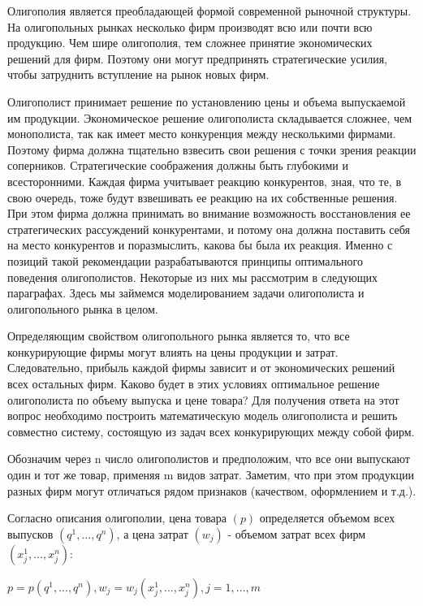 \documentclass[12pt, 4paper]{book}
\begin{document}
{Олигополия является преобладающей формой современной рыночной структуры. На олигопольных рынках несколько фирм производят всю или почти всю продукцию. Чем шире олигополия, тем сложнее принятие экономических решений для фирм. Поэтому они могут предпринять стратегические усилия, чтобы затруднить вступление на рынок новых фирм.
\par

Олигополист принимает решение по установлению цены и объема выпускаемой им продукции. Экономическое решение олигополиста складывается сложнее, чем монополиста, так как имеет место конкуренция между несколькими фирмами. Поэтому фирма должна тщательно взвесить свои решения с точки зрения реакции соперников. Стратегические соображения должны быть глубокими и всесторонними. Каждая фирма учитывает реакцию конкурентов, зная, что те, в свою очередь, тоже будут взвешивать ее реакцию на их собственные решения. При этом фирма должна принимать во внимание возможность восстановления ее стратегических рассуждений конкурентами, и потому она должна поставить себя на место конкурентов и поразмыслить, какова бы была их реакция. Именно с позиций такой рекомендации разрабатываются принципы оптимального поведения олигополистов. Некоторые из них мы рассмотрим в следующих параграфах. Здесь мы займемся моделированием задачи олигополиста и олигопольного рынка в целом.
\par

Определяющим свойством олигопольного рынка является то, что все конкурирующие фирмы могут влиять на цены продукции и затрат. Следовательно, прибыль каждой фирмы зависит и от экономических решений всех остальных фирм. Каково будет в этих условиях оптимальное решение олигополиста по объему выпуска и цене товара? Для получения ответа на этот вопрос необходимо построить математическую модель олигополиста и решить совместно систему, состоящую из задач всех конкурирующих между собой фирм.
\par

Обозначим через n число олигополистов и предположим, что все они выпускают один и тот же товар, применяя m видов затрат. Заметим, что при этом продукции разных фирм могут отличаться рядом признаков (качеством, оформлением и т.д.).
\par

Согласно описания олигополии, цена товара $(p)$ определяется объемом всех выпусков $(q^1,...,q^n)$, а цена затрат $(w_j)$ - объемом затрат всех фирм $(x_{j}^{1},...,x_{j}^n)$:
\begin{center}
$p=p(q^1,...,q^n), w_j=w_j(x_{j}^{1},...,x_{j}^n),j=1,...,m$
\end{center}
\par

}
\end{document}
